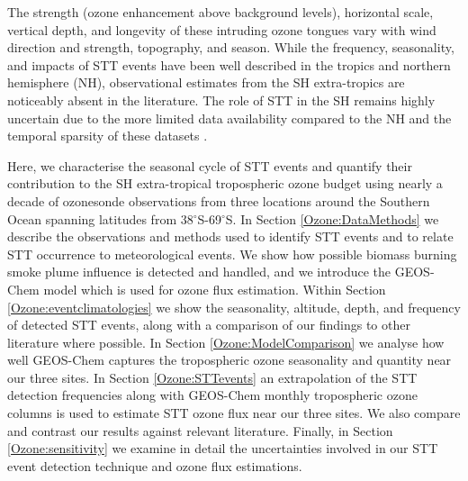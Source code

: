   The strength (ozone enhancement above background levels), horizontal scale, vertical depth, and longevity of these intruding ozone tongues vary with wind direction and strength, topography, and season.
  While the frequency, seasonality, and impacts of STT events have been well described in the tropics and northern hemisphere (NH), observational estimates from the SH extra-tropics are noticeably absent in the literature. 
  The role of STT in the SH remains highly uncertain due to the more limited data availability compared to the NH and the temporal sparsity of these datasets \citep{Mze2010, Thompson2014, Liu2015}. 
  
  Here, we characterise the seasonal cycle of STT events and quantify their contribution to the SH extra-tropical tropospheric ozone budget using nearly a decade of ozonesonde observations from three locations around the Southern Ocean spanning latitudes from 38$^{\circ}$S-69$^{\circ}$S. 
  In Section \ref{Ozone:DataMethods} we describe the observations and methods used to identify STT events and to relate STT occurrence to meteorological events. 
  We show how possible biomass burning smoke plume influence is detected and handled, and we introduce the GEOS-Chem model which is used for ozone flux estimation.
  Within Section \ref{Ozone:eventclimatologies} we show the seasonality, altitude, depth, and frequency of detected STT events, along with a comparison of our findings to other literature where possible. 
  In Section \ref{Ozone:ModelComparison} we analyse how well GEOS-Chem captures the tropospheric ozone seasonality and quantity near our three sites.
  In Section \ref{Ozone:STTevents} an extrapolation of the STT detection frequencies along with GEOS-Chem monthly tropospheric ozone columns is used to estimate STT ozone flux near our three sites. 
  We also compare and contrast our results against relevant literature. 
  Finally, in Section \ref{Ozone:sensitivity} we examine in detail the uncertainties involved in our STT event detection technique and ozone flux estimations.
  

